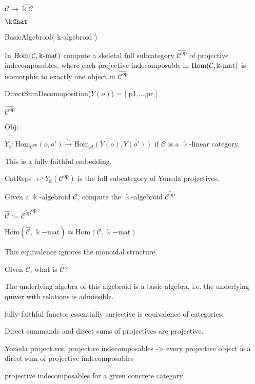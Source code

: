$\mathcal{C} \rightarrow \widehat{\Bbbk\mathcal{C}}$

$\kChat$

BasicAlgebroid( k-algebroid )

In $\mathrm{Hom}(\mathcal{C},\Bbbk\textnormal{-}\mathrm{mat})$ compute a skeletal full subcategory
$\widehat{\mathcal{C}^{\mathrm{op}}}$ of projective indecomposables,
where each projective indecomposable in $\mathrm{Hom}(\mathcal{C},\Bbbk\textnormal{-}\mathrm{mat})$ is isomorphic to exactly one
object in $\widehat{\mathcal{C}^{\mathrm{op}}}$.

DirectSumDecomoposition($Y(o)$) = [ p1,...,pr ]

$\widehat{\mathcal{C}^{\mathrm{op}}}$

$\mathrm{Obj}$: 

$Y_{\Bbbk} : \mathrm{Hom}_{\mathcal{C}^{\mathrm{op}}}(o,o') \xrightarrow{\sim} \mathrm{Hom}_\mathcal{A} (Y(o),Y(o'))$ if $\mathcal{C}$ is a $\Bbbk$-linear category.

This is a fully faithful embedding.

CatReps $\hookleftarrow Y_{\Bbbk}(\mathcal{C}^{\mathrm{op}})$ is the full subcategory of Yoneda projectives.

Given a $\Bbbk$-algebroid $\mathcal{C}$, compute the $\Bbbk$-algebroid $\widehat{\mathcal{C}^{\mathrm{op}}}$ 

$\widehat{\mathcal{C}} := \widehat{\mathcal{C}^{\mathrm{op}}}^{\mathrm{op}}$

$\mathrm{Hom}(\widehat{\mathcal{C}},\Bbbk\mathrm{-mat}) \simeq \mathrm{Hom}(\mathcal{C},\Bbbk\mathrm{-mat})$

This equivalence ignores the monoidal structure.

Given $\mathcal{C}$, what is $\widehat{\mathcal{C}}$?

The underlying algebra of this algebroid is a basic algebra, i.e. the underlying quiver with relations is admissible.

fully-faithful functor essentially surjective is equivalence of categories.


Direct summands and direct sums of projectives are projective.

Yoneda projectives, projective indecomposables -> every projective object is a direct sum of projective indecomposables

projective indecomposables for a given concrete category
